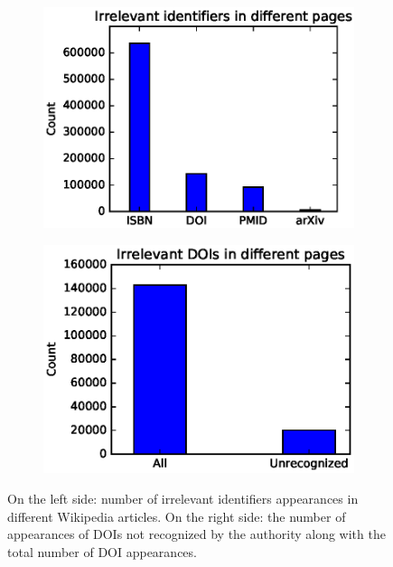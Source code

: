 \begin{figure}[h]
    \centering
    \begin{subfigure}{.5\textwidth}
        \centering
        \includegraphics[keepaspectratio=true, width=\textwidth]{assets/irrelevant_identifiers_count_by_type}
    \end{subfigure}%
    \begin{subfigure}{.5\textwidth}
        \centering
        \includegraphics[keepaspectratio=true, width=\textwidth]{assets/irrelevant_doi_count_by_validity}
    \end{subfigure}
    \caption{On the left side: number of irrelevant identifiers appearances in different Wikipedia articles.
    On the right side: the number of appearances of DOIs not recognized by the authority along with the total number of DOI appearances.}
\label{fig:irrelevant_identifiers_count}
\end{figure}

